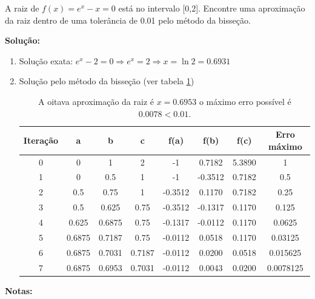 \begin{example}
 A raiz de $ f(x) = e^{x} - x = 0 $
está no intervalo [0,2]. Encontre uma aproximação da raiz dentro de uma tolerância de 0.01 pelo método da bisseção.

\textbf{Solução:}

\begin{enumerate}
 \item Solução exata: $ e^{x} - 2 = 0 \Rightarrow e^{x} = 2 \Rightarrow x = \ln 2 = 0.6931 $
 \item Solução pelo método da bisseção (ver tabela \ref{tab:bissecao})

\begin{table}[htp]
\footnotesize
	\centering
		
		\begin{tabular}{|c|c|c|c|c|c|c|c|}
		\hline		
		\textbf{Iteração} & \textbf{a} & \textbf{b} & \textbf{c} & \textbf{f(a)} & \textbf{f(b)} & \textbf{f(c)} & \textbf{Erro máximo}\\
		\hline \hline 
		0 & 0 & 1 & 2 & -1 & 0.7182 & 5.3890 & 1\\
		\hline 
		1 & 0 & 0.5 & 1 & -1 & -0.3512 & 0.7182 & 0.5\\
		\hline 
		2 & 0.5 & 0.75 & 1 & -0.3512 & 0.1170 & 0.7182 & 0.25\\
		\hline 
		3 & 0.5 & 0.625 & 0.75 & -0.3512 & -0.1317 & 0.1170 & 0.125\\
		\hline 
		4 & 0.625 & 0.6875 & 0.75 & -0.1317 & -0.0112 & 0.1170 & 0.0625\\
		\hline 
		5 & 0.6875 & 0.7187 & 0.75 & -0.0112 & 0.0518 & 0.1170 & 0.03125\\
		\hline  
		6 & 0.6875 & 0.7031 & 0.7187 & -0.0112 & 0.0200 & 0.0518 & 0.015625\\
		\hline 
		7 & 0.6875 & 0.6953 & 0.7031 & -0.0112 & 0.0043 & 0.0200 & 0.0078125\\
		\hline
		\end{tabular}
	\caption[Exemplo de iterações do método da bisseção]{A oitava aproximação da raiz é $x = 0.6953$ o máximo erro possível é $0.0078 < 0.01$.}
	\label{tab:bissecao}
\end{table}

\end{enumerate}

\end{example}

\textbf{Notas:}


